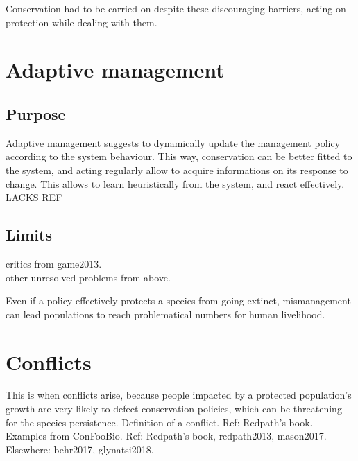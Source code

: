 \documentclass[12pt,a4paper]{article}
\begin{document}
Conservation had to be carried on despite these discouraging barriers, acting on protection while dealing with them.

\section{Adaptive management}

\subsection{Purpose}

Adaptive management suggests to dynamically update the management policy according to the system behaviour.
This way, conservation can be better fitted to the system, and acting regularly allow to acquire informations on its response to change.
This allows to learn heuristically from the system, and react effectively.
LACKS REF

\subsection{Limits}

critics from game2013.\\
other unresolved problems from above.

Even if a policy effectively protects a species from going extinct, mismanagement can lead populations to reach problematical numbers for human livelihood.

\section{Conflicts}

This is when conflicts arise, because people impacted by a protected population's growth are very likely to defect conservation policies, which can be threatening for the species persistence.
Definition of a conflict. Ref: Redpath's book.\\
Examples from ConFooBio. Ref: Redpath's book, redpath2013, mason2017.
Elsewhere: behr2017, glynatsi2018.
\end{document}
